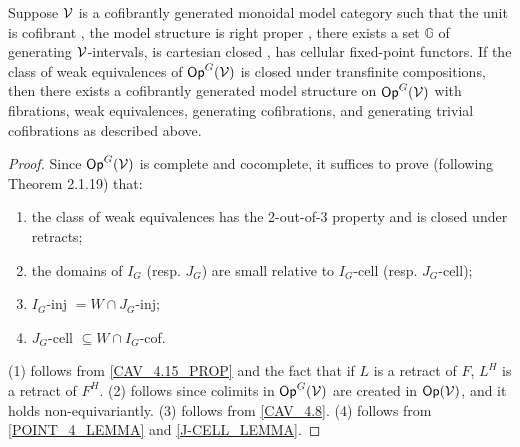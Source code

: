 \documentclass[psamsfonts,oneside,10pt,letterpaper
,draft
]{amsart}%
\renewcommand{\1}{\ensuremath{\mathbb{id}}}
\begin{document}
\begin{theorem}
      \label{MODEL_THEOREM}
      Suppose $\mathcal V$ is a cofibrantly generated monoidal model category such that
      the unit is cofibrant ,
      the model structure is right proper ,
      there exists a set $\mathbb{G}$ of generating $\mathcal V$-intervals,
      is cartesian closed ,
      has cellular fixed-point functors. %
      If the class of weak equivalences of $\mathsf{Op}^G(\mathcal V)$ is closed under transfinite compositions,
      then there exists a cofibrantly generated model structure on $\mathsf{Op}^G(\mathcal V)$ with
      fibrations, weak equivalences, generating cofibrations, and generating trivial cofibrations as described above.
\end{theorem}
\begin{proof}
      Since $\mathsf{Op}^G(\mathcal V)$ is complete and cocomplete, it suffices to prove (following \cite{Hov98} Theorem 2.1.19) that:
      \begin{enumerate}
      \item the class of weak equivalences has the 2-out-of-3 property and is closed under retracts;
      \item the domains of $I_{G}$ (resp. $J_{G}$) are small relative to $I_{G}$-cell (resp. $J_{G}$-cell);
      \item $I_{G}$-inj $= W\cap J_{G}$-inj;
      \item $J_{G}$-cell $\subseteq W\cap I_{G}$-cof.
      \end{enumerate}
      (1) follows from \ref{CAV_4.15_PROP} and the fact that if $L$ is a retract of $F$, $L^H$ is a retract of $F^H$.
      (2) follows since colimits in $\mathsf{Op}^G(\mathcal V)$ are created in $\mathsf{Op}(\mathcal V)$, and it holds non-equivariantly.
      (3) follows from \ref{CAV_4.8}.
      (4) follows from \ref{POINT_4_LEMMA} and \ref{J-CELL_LEMMA}.
\end{proof}





{}


\end{document}
